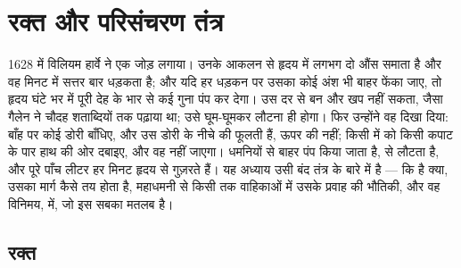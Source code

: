\chapter{रक्त और परिसंचरण तंत्र}\label{ch:b2:blood-circulation}

1628 में विलियम हार्वे ने एक जोड़ लगाया। उनके आकलन से हृदय में लगभग दो
औंस  समाता है और वह मिनट में सत्तर बार धड़कता है; और यदि हर धड़कन
पर उसका कोई अंश भी बाहर फेंका जाए, तो हृदय घंटे भर में पूरी देह के भार
से कई गुना पंप कर देगा।  उस दर से बन और खप नहीं सकता, जैसा गैलेन ने
चौदह शताब्दियों तक पढ़ाया था; उसे घूम-घूमकर लौटना ही होगा। फिर उन्होंने
वह दिखा दिया: बाँह पर कोई डोरी बाँधिए, और उस डोरी के नीचे की 
फूलती हैं, ऊपर की नहीं; किसी  में  को किसी कपाट के पार हाथ की
ओर दबाइए, और वह नहीं जाएगा।  धमनियों से बाहर पंप किया जाता है,
 से लौटता है, और पूरे पाँच लीटर हर मिनट हृदय से गुज़रते हैं। यह
अध्याय उसी बंद तंत्र के बारे में है --- कि  है क्या, उसका मार्ग कैसे
तय होता है, महाधमनी से किसी  तक वाहिकाओं में उसके प्रवाह की
भौतिकी, और वह विनिमय,  में, जो इस सबका मतलब है।

\section{रक्त}

